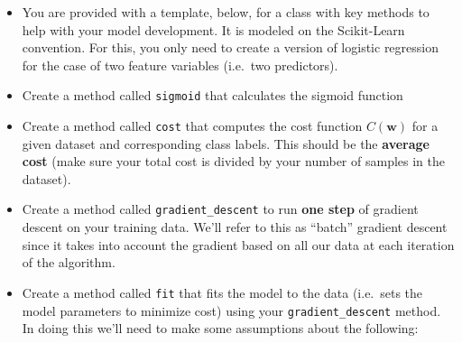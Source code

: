 \documentclass[
  letterpaper,
  DIV=11,
  numbers=noendperiod]{scrartcl}
\begin{document}
\begin{itemize}
\item
  You are provided with a template, below, for a class with key methods
  to help with your model development. It is modeled on the Scikit-Learn
  convention. For this, you only need to create a version of logistic
  regression for the case of two feature variables (i.e.~two
  predictors).
\item
  Create a method called \texttt{sigmoid} that calculates the sigmoid
  function
\item
  Create a method called \texttt{cost} that computes the cost function
  \(C(\mathbf{w})\) for a given dataset and corresponding class labels.
  This should be the \textbf{average cost} (make sure your total cost is
  divided by your number of samples in the dataset).
\item
  Create a method called \texttt{gradient\_descent} to run \textbf{one
  step} of gradient descent on your training data. We'll refer to this
  as ``batch'' gradient descent since it takes into account the gradient
  based on all our data at each iteration of the algorithm.
\item
  Create a method called \texttt{fit} that fits the model to the data
  (i.e.~sets the model parameters to minimize cost) using your
  \texttt{gradient\_descent} method. In doing this we'll need to make
  some assumptions about the following:


\end{itemize}
\end{document}
